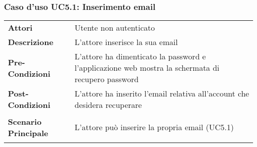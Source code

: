 \subsubsection{Caso d'uso UC5.1: Inserimento email}
\label{UC5_1}

\begin{minipage}{\linewidth}
\begin{longtable}{ l | p{11cm}}
	\hline
	\rowcolor{Gray}
	 \multicolumn{2}{c}{UC5.1 - Inserimento email} \\
	 \hline
	\textbf{Attori} & Utente non autenticato \\
	\textbf{Descrizione} & L'attore inserisce la sua email  \\
	\textbf{Pre-Condizioni} & L'attore ha dimenticato la password e l'applicazione web mostra la schermata di recupero password\\
	\textbf{Post-Condizioni} & L'attore ha inserito l'email relativa all'account che desidera recuperare\\
	\textbf{Scenario Principale} & \begin{enumerate*}[label=(\arabic*.),itemjoin={\newline}]
		\item L'attore può inserire la propria email (UC5.1)
	\end{enumerate*}\\
\end{longtable}
\end{minipage}